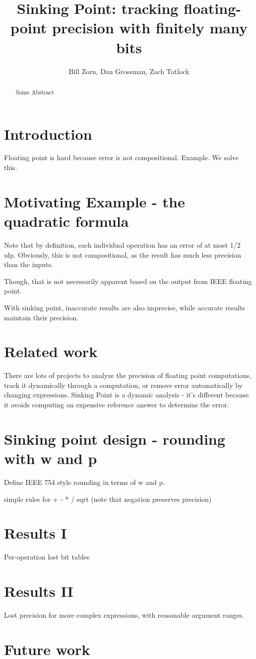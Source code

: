 \documentclass[letterpaper,10pt]{article}
\title{Sinking Point: tracking floating-point precision with finitely many bits}
\author{Bill Zorn, Dan Grossman, Zach Tatlock}
\begin{document}
\maketitle

\begin{abstract}
 Some Abstract
\end{abstract}


\section{Introduction}

Floating point is hard because error is not compositional. Example. We solve this.

\section{Motivating Example - the quadratic formula}

Note that by definition, each individual operation has an error of at most 1/2 ulp. Obviously, this is not compositional, as the result has much less precision than the inputs.

Though, that is not necessarily apparent based on the output from IEEE floating point.

With sinking point, inaccurate results are also imprecise, while accurate results maintain their precision.

\section{Related work}

There are lots of projects to analyze the precision of floating point computations, track it dynamically through a computation, or remove error automatically by changing expressions. Sinking Point is a dynamic analysis - it's different because it avoids computing an expensive reference answer to determine the error.

\section{Sinking point design - rounding with w and p}

Define IEEE 754 style rounding in terms of w and p.

simple rules for + - * / sqrt (note that negation preserves precision)

\section{Results I}

Per-operation lost bit tables

\section{Results II}

Lost precision for more complex expressions, with reasonable argument ranges.

\section{Future work}





\end{document}
